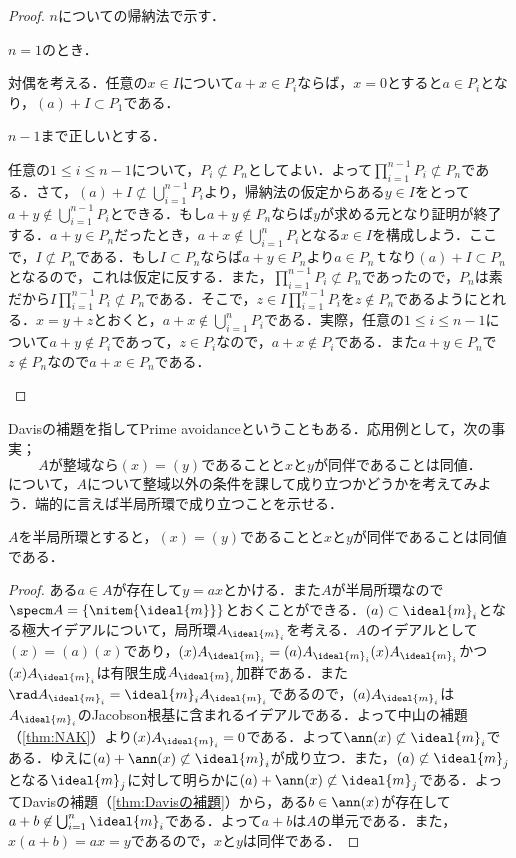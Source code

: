 \begin{proof}
	$n$についての帰納法で示す．
	
	\begin{step}
		\item $n=1$のとき．
		
		対偶を考える．任意の$x\in I$について$a+x\in P_i$ならば，$x=0$とすると$a\in P_i$となり，$(a)+I\subset P_1$である．
		
		\item $n-1$まで正しいとする．
		
		任意の$1\leq i\leq n-1$について，$P_i\not\subset P_n$としてよい．よって$\prod_{i=1}^{n-1}P_i\not\subset P_n$である．さて，$(a)+I\not\subset\bigcup_{i=1}^{n-1}P_i$より，帰納法の仮定からある$y\in I$をとって$a+y\not\in\bigcup_{i=1}^{n-1}P_i$とできる．もし$a+y\not\in P_n$ならば$y$が求める元となり証明が終了する．$a+y\in P_n$だったとき，$a+x\not\in \bigcup_{i=1}^n P_i$となる$x\in I$を構成しよう．ここで，$I\not\subset P_n$である．もし$I\subset P_n$ならば$a+y\in P_n$より$a\in P_n$ｔなり$(a)+I\subset P_n$となるので，これは仮定に反する．また，$\prod_{i=1}^{n-1}P_i\not\subset P_n$であったので，$P_n$は素だから$I\prod_{i=1}^{n-1}P_i\not\subset P_n$である．そこで，$z\in I\prod_{i=1}^{n-1}P_i$を$z\not\in P_n$であるようにとれる．$x=y+z$とおくと，$a+x\not\in\bigcup_{i=1}^n P_i$である．実際，任意の$1\leq i\leq n-1$について$a+y\not\in P_i$であって，$z\in P_i$なので，$a+x\not\in P_i$である．また$a+y\in P_n$で$z\not\in P_n$なので$a+x\in P_n$である．	
	\end{step}
\end{proof}

Davisの補題を指してPrime avoidanceということもある．応用例として，次の事実；
\[A\text{が整域なら}(x)=(y)\text{であることと}x\text{と}y\text{が同伴であることは同値．}\]
について，$A$について整域以外の条件を課して成り立つかどうかを考えてみよう．端的に言えば半局所環で成り立つことを示せる．

\begin{prop}\label{prop:半局所環と同伴関係}
	$A$を半局所環とすると，$(x)=(y)$であることと$x$と$y$が同伴であることは同値である．
\end{prop}

\begin{proof}
	ある$a\in A$が存在して$y=ax$とかける．また$A$が半局所環なので$\specm A=\{\nitem{\ideal{m}}\}$とおくことができる．$(a)\subset\ideal{m}_i$となる極大イデアルについて，局所環$A_{\ideal{m}_i}$を考える．$A$のイデアルとして$(x)=(a)(x)$であり，$(x)A_{\ideal{m}_i}=(a)A_{\ideal{m}_i}(x)A_{\ideal{m}_i}$かつ$(x)A_{\ideal{m}_i}$は有限生成$A_{\ideal{m}_i}$加群である．また$\rad A_{\ideal{m}_i}=\ideal{m}_iA_{\ideal{m}_i}$であるので，$(a)A_{\ideal{m}_i}$は$A_{\ideal{m}_i}$のJacobson根基に含まれるイデアルである．よって中山の補題（\ref{thm:NAK}）より$(x)A_{\ideal{m}_i}=0$である．よって$\ann (x)\not\subset\ideal{m}_i$である．ゆえに$(a)+\ann (x)\not\subset\ideal{m}_i$が成り立つ．また，$(a)\not\subset\ideal{m}_j$となる$\ideal{m}_j$に対して明らかに$(a)+\ann (x)\not\subset\ideal{m}_j$である．よってDavisの補題（\ref{thm:Davisの補題}）から，ある$b\in\ann(x)$が存在して$a+b\not\in\bigcup_{i=1}^n\ideal{m}_i$である．よって$a+b$は$A$の単元である．また，$x(a+b)=ax=y$であるので，$x$と$y$は同伴である．
\end{proof}

